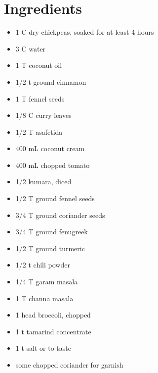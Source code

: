 \documentclass[letterpaper,10pt,english]{sphinxmanual}
\begin{document}
\section{Ingredients}
\label{chickpea_curry:ingredients}\begin{itemize}
\item {} 
1   C   dry chickpeas, soaked for at least 4 hours

\item {} 
3   C   water

\item {} 
1   T   coconut oil

\item {} 
1/2     t   ground cinnamon

\item {} 
1   T   fennel seeds

\item {} 
1/8     C   curry leaves

\item {} 
1/2     T   asafetida

\item {} 
400     mL  coconut cream

\item {} 
400     mL  chopped tomato

\item {} 
1/2         kumara, diced

\item {} 
1/2     T   ground fennel seeds

\item {} 
3/4     T   ground coriander seeds

\item {} 
3/4     T   ground fenugreek

\item {} 
1/2     T   ground turmeric

\item {} 
1/2     t   chili powder

\item {} 
1/4     T   garam masala

\item {} 
1   T   channa masala

\item {} 
1       head broccoli, chopped

\item {} 
1   t   tamarind concentrate

\item {} 
1   t   salt or to taste

\item {} 
some        chopped coriander for garnish

\end{itemize}
\end{document}
